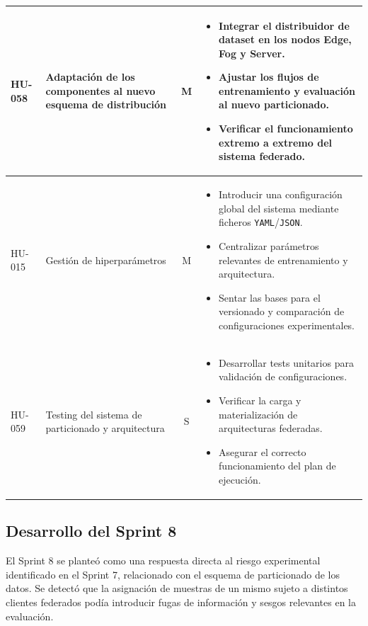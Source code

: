 \documentclass{report}
\begin{document}
\begin{table}[H]
\begin{tabular}{|l|p{4.8cm}|c|p{5.6cm}|}
HU-058 &
Adaptación de los componentes al nuevo esquema de distribución &
M &
\begin{itemize}\setlength\itemsep{0.15em}
  \item Integrar el distribuidor de dataset en los nodos Edge, Fog y Server.
  \item Ajustar los flujos de entrenamiento y evaluación al nuevo particionado.
  \item Verificar el funcionamiento extremo a extremo del sistema federado.
\end{itemize}
\\ \hline

HU-015 &
Gestión de hiperparámetros &
M &
\begin{itemize}\setlength\itemsep{0.15em}
  \item Introducir una configuración global del sistema mediante ficheros \texttt{YAML}/\texttt{JSON}.
  \item Centralizar parámetros relevantes de entrenamiento y arquitectura.
  \item Sentar las bases para el versionado y comparación de configuraciones experimentales.
\end{itemize}
\\ \hline

HU-059 &
Testing del sistema de particionado y arquitectura &
S &
\begin{itemize}\setlength\itemsep{0.15em}
  \item Desarrollar tests unitarios para validación de configuraciones.
  \item Verificar la carga y materialización de arquitecturas federadas.
  \item Asegurar el correcto funcionamiento del plan de ejecución.
\end{itemize}
\\ \hline

\end{tabular}
\end{table}


\subsection{Desarrollo del Sprint 8}

El Sprint 8 se planteó como una respuesta directa al riesgo experimental identificado en el Sprint 7, relacionado con el esquema de particionado de los datos. Se detectó que la asignación de muestras de un mismo sujeto a distintos clientes federados podía introducir fugas de información y sesgos relevantes en la evaluación.
\end{document}
